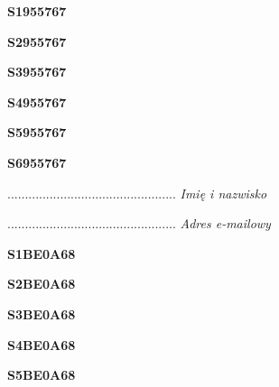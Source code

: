 \begin{turn}{90}\huge \textbf{S1955767}\end{turn}

\begin{turn}{90}\huge \textbf{S2955767}\end{turn}

\begin{turn}{90}\huge \textbf{S3955767}\end{turn}

\begin{turn}{90}\huge \textbf{S4955767}\end{turn}

\begin{turn}{90}\huge \textbf{S5955767}\end{turn}

\begin{turn}{90}\huge \textbf{S6955767}\end{turn}

\begin{turn}{90}\begin{minipage}{\linewidth} \vspace{20mm} ................................................  \textit{Imię i nazwisko}\end{minipage}\end{turn}

\begin{turn}{90}\begin{minipage}{\linewidth} \vspace{20mm} ................................................  \textit{Adres e-mailowy}\end{minipage}\end{turn}

\begin{turn}{90}\huge \textbf{S1BE0A68}\end{turn}

\begin{turn}{90}\huge \textbf{S2BE0A68}\end{turn}

\begin{turn}{90}\huge \textbf{S3BE0A68}\end{turn}

\begin{turn}{90}\huge \textbf{S4BE0A68}\end{turn}

\begin{turn}{90}\huge \textbf{S5BE0A68}\end{turn}

